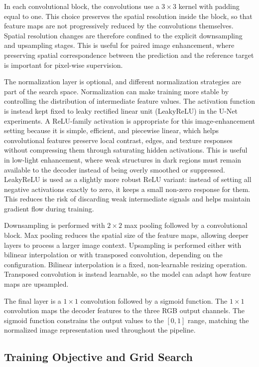 In each convolutional block, the convolutions use a $3 \times 3$ kernel with padding equal to one. This choice preserves the spatial resolution inside the block, so that feature maps are not progressively reduced by the convolutions themselves. Spatial resolution changes are therefore confined to the explicit downsampling and upsampling stages. This is useful for paired image enhancement, where preserving spatial correspondence between the prediction and the reference target is important for pixel-wise supervision.

The normalization layer is optional, and different normalization strategies are part of the search space. Normalization can make training more stable by controlling the distribution of intermediate feature values. The activation function is instead kept fixed to leaky rectified linear unit (LeakyReLU) in the U-Net experiments. A ReLU-family activation is appropriate for this image-enhancement setting because it is simple, efficient, and piecewise linear, which helps convolutional features preserve local contrast, edges, and texture responses without compressing them through saturating hidden activations. This is useful in low-light enhancement, where weak structures in dark regions must remain available to the decoder instead of being overly smoothed or suppressed. LeakyReLU is used as a slightly more robust ReLU variant: instead of setting all negative activations exactly to zero, it keeps a small non-zero response for them. This reduces the risk of discarding weak intermediate signals and helps maintain gradient flow during training.

Downsampling is performed with $2 \times 2$ max pooling followed by a convolutional block. Max pooling reduces the spatial size of the feature maps, allowing deeper layers to process a larger image context. Upsampling is performed either with bilinear interpolation or with transposed convolution, depending on the configuration. Bilinear interpolation is a fixed, non-learnable resizing operation. Transposed convolution is instead learnable, so the model can adapt how feature maps are upsampled.

The final layer is a $1 \times 1$ convolution followed by a sigmoid function. The $1 \times 1$ convolution maps the decoder features to the three RGB output channels. The sigmoid function constrains the output values to the $[0,1]$ range, matching the normalized image representation used throughout the pipeline.

\subsection{Training Objective and Grid Search}


